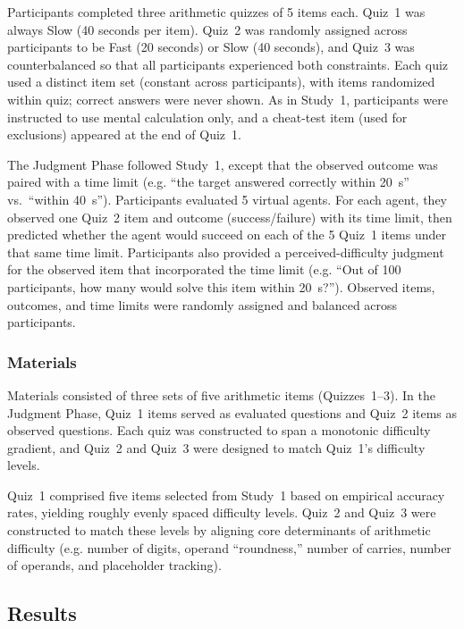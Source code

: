 \documentclass[10pt,letterpaper]{article}
\begin{document}
Participants completed three arithmetic quizzes of 5 items each. Quiz~1 was always Slow (40 seconds per item). Quiz~2 was randomly assigned across participants to be Fast (20 seconds) or Slow (40 seconds), and Quiz~3 was counterbalanced so that all participants experienced both constraints. Each quiz used a distinct item set (constant across participants), with items randomized within quiz; correct answers were never shown. As in Study~1, participants were instructed to use mental calculation only, and a cheat-test item (used for exclusions) appeared at the end of Quiz~1.

The Judgment Phase followed Study~1, except that the observed outcome was paired with a time limit (e.g. “the target answered correctly within 20~s” vs.\ “within 40~s”). Participants evaluated 5 virtual agents. For each agent, they observed one Quiz~2 item and outcome (success/failure) with its time limit, then predicted whether the agent would succeed on each of the 5 Quiz~1 items under that same time limit. Participants also provided a perceived-difficulty judgment for the observed item that incorporated the time limit (e.g. “Out of 100 participants, how many would solve this item within 20~s?”). Observed items, outcomes, and time limits were randomly assigned and balanced across participants.

\subsubsection{Materials}\label{materials-2}

Materials consisted of three sets of five arithmetic items (Quizzes~1--3). In the Judgment Phase, Quiz~1 items served as evaluated questions and Quiz~2 items as observed questions. Each quiz was constructed to span a monotonic difficulty gradient, and Quiz~2 and Quiz~3 were designed to match Quiz~1’s difficulty levels.

Quiz~1 comprised five items selected from Study~1 based on empirical accuracy rates, yielding roughly evenly spaced difficulty levels. Quiz~2 and Quiz~3 were constructed to match these levels by aligning core determinants of arithmetic difficulty \citep{Dehaene-2011} (e.g. number of digits, operand “roundness,” number of carries, number of operands, and placeholder tracking).


\subsection{Results}\label{results-2}
\end{document}
